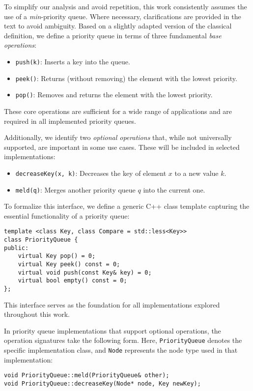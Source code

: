 To simplify our analysis and avoid repetition, this work consistently assumes the use of a \emph{min}-priority queue. Where necessary, clarifications are provided in the text to avoid ambiguity. Based on a slightly adapted version of the classical definition, we define a priority queue in terms of three fundamental \emph{base operations}:

\begin{itemize}
    \item \texttt{push(k)}: Inserts a key into the queue.
    \item \texttt{peek()}: Returns (without removing) the element with the lowest priority.
    \item \texttt{pop()}: Removes and returns the element with the lowest priority.
\end{itemize}

These core operations are sufficient for a wide range of applications and are required in all implemented priority queues.

Additionally, we identify two \emph{optional operations} that, while not universally supported, are important in some use cases. These will be included in selected implementations:

\begin{itemize}
    \item \texttt{decreaseKey(x, k)}: Decreases the key of element \( x \) to a new value \( k \).
    \item \texttt{meld(q)}: Merges another priority queue \( q \) into the current one.
\end{itemize}

To formalize this interface, we define a generic C++ class template capturing the essential functionality of a priority queue:

\begin{verbatim}
template <class Key, class Compare = std::less<Key>>
class PriorityQueue {
public:
    virtual Key pop() = 0;
    virtual Key peek() const = 0;
    virtual void push(const Key& key) = 0;
    virtual bool empty() const = 0;
};
\end{verbatim}

This interface serves as the foundation for all implementations explored throughout this work.

In priority queue implementations that support optional operations, the operation signatures take the following form. Here, \texttt{PriorityQueue} denotes the specific implementation class, and \texttt{Node} represents the node type used in that implementation:

\begin{verbatim}
void PriorityQueue::meld(PriorityQueue& other);
void PriorityQueue::decreaseKey(Node* node, Key newKey);
\end{verbatim}